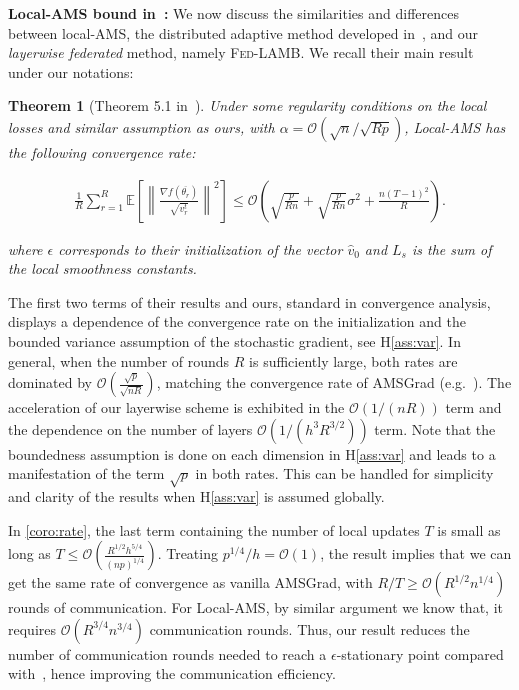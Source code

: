 \documentclass[11pt]{article}
\newtheorem{Theorem}{Theorem}
\newcommand{\beq}{\begin{equation}}
\newcommand{\eeq}{\end{equation}}
\def\EE{\mathbb{E}}
\newcommand{\algo}{\textsc{Fed-LAMB}}
\begin{document}
\vspace{0.05in}
\textbf{Local-AMS bound in~\cite{chen2020toward}: }
We now discuss the similarities and differences between local-AMS, the distributed adaptive method developed in~\cite{chen2020toward}, and our \emph{layerwise federated} method, namely \algo.
We recall their main result under our notations:
\begin{Theorem}[Theorem 5.1 in~\cite{chen2020toward}]
Under some regularity conditions on the local losses and similar assumption as ours, with $\alpha=\mathcal O(\sqrt{n}/\sqrt{Rp})$, Local-AMS has the following convergence rate:

\beq 
\begin{split}
 \frac{1}{R}\sum_{r=1}^R  \EE\left[ \left\| \frac{\nabla f(\overline{\theta_r})}{\sqrt{ v_r^t}}   \right \|^2 \right]     \leq  \mathcal O( \sqrt{\frac{p}{Rn}} +   \sqrt{\frac{p}{Rn}}\sigma^2 +\frac{n(T-1)^2}{R} ).
 \end{split}
\eeq

where $\epsilon$ corresponds to their initialization of the vector $\hat v_0$ and $L_{s}$ is the sum of the local smoothness constants.
\end{Theorem}

The first two terms of their results and ours, standard in convergence analysis, displays a dependence of the convergence rate on the initialization and the bounded variance assumption of the stochastic gradient, see H\ref{ass:var}. In general, when the number of rounds $R$ is sufficiently large, both rates are dominated by $\mathcal O(\frac{\sqrt p}{\sqrt{n R}})$, matching the convergence rate of AMSGrad (e.g.~\cite{Arxiv:Zhou_18}).
The acceleration of our layerwise scheme is exhibited in the $\mathcal O(1/(n R))$ term and the dependence on the number of layers $\mathcal O(1/(h^3 R^{3/2}))$ term. Note that the boundedness assumption is done on each dimension in H\ref{ass:var} and leads to a manifestation of the term $\sqrt{p}$ in both rates. This can be handled for simplicity and clarity of the results when H\ref{ass:var} is assumed globally.

In \eqref{coro:rate}, the last term containing the number of local updates $T$ is small as long as $T\leq \mathcal O(\frac{R^{1/2}h^{5/4}}{(np)^{1/4}})$. 
Treating $p^{1/4}/h=\mathcal O(1)$, the result implies that we can get the same rate of convergence as vanilla AMSGrad, with $R/T\geq \mathcal{O}(R^{1/2}n^{1/4})$ rounds of communication. For Local-AMS, by similar argument we know that, it requires $\mathcal O(R^{3/4}n^{3/4})$ communication rounds. Thus, our result reduces the number of communication rounds needed to reach a $\epsilon$-stationary point compared with~\cite{chen2020toward}, hence improving the communication efficiency.
\end{document}
